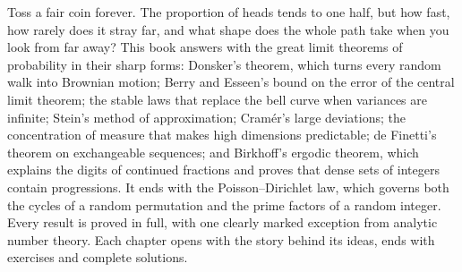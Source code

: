 Toss a fair coin forever. The proportion of heads tends to one half, but how fast, how rarely does it stray far, and what
shape does the whole path take when you look from far away? This book answers with the great limit theorems of probability
in their sharp forms: Donsker's theorem, which turns every random walk into Brownian motion; Berry and Esseen's bound on the
error of the central limit theorem; the stable laws that replace the bell curve when variances are infinite; Stein's method
of approximation; Cram\'er's large deviations; the concentration of measure that makes high dimensions predictable; de
Finetti's theorem on exchangeable sequences; and Birkhoff's ergodic theorem, which explains the digits of continued fractions
and proves that dense sets of integers contain progressions. It ends with the Poisson--Dirichlet law, which governs both the
cycles of a random permutation and the prime factors of a random integer. Every result is proved in full, with one clearly marked exception from analytic number theory. Each chapter
opens with the story behind its ideas, ends with exercises and complete solutions.
